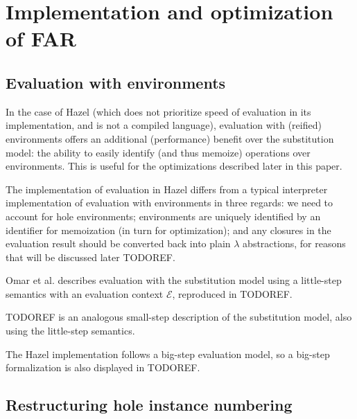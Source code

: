 \section{Implementation and optimization of FAR}
\label{sec:far_impl}

\subsection{Evaluation with environments}
\label{sec:eval_with_envs}

In the case of Hazel (which does not prioritize speed of evaluation in its implementation, and is not a compiled language), evaluation with (reified) environments offers an additional (performance) benefit over the substitution model: the ability to easily identify (and thus memoize) operations over environments. This is useful for the optimizations described later in this paper.

The implementation of evaluation in Hazel differs from a typical interpreter implementation of evaluation with environments in three regards: we need to account for hole environments; environments are uniquely identified by an identifier for memoization (in turn for optimization); and any closures in the evaluation result should be converted back into plain $\lambda$ abstractions, for reasons that will be discussed later TODOREF.


Omar et al. \cite{conf/popl/HazelnutLive19} describes evaluation with the substitution model using a little-step semantics with an evaluation context $\mathcal{E}$, reproduced in TODOREF.


TODOREF is an analogous small-step description of the substitution model, also using the little-step semantics.


The Hazel implementation follows a big-step evaluation model, so a big-step formalization is also displayed in TODOREF.




\subsection{Restructuring hole instance numbering}
\label{sec:restructuring_hole_numbering}

